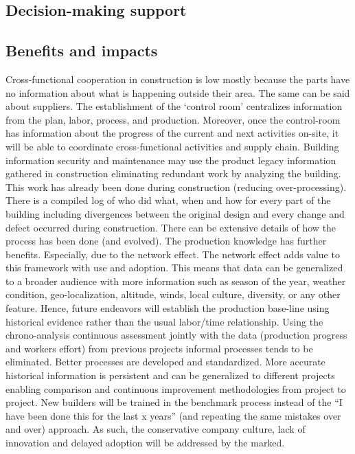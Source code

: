 \documentclass{article}
\begin{document}
\subsection{Decision-making support}
\label{sec:orgb32e0cd}
\subsection{Benefits and impacts}
\label{sec:orga5f2fc6}

Cross-functional cooperation in construction is low mostly because the parts have no information about what is happening outside their area.
The same can be said about suppliers. The establishment of the ‘control room’ centralizes information from the plan, labor, process, and production.
Moreover, once the control-room has information about the progress of the current and next activities on-site, it will be able to coordinate cross-functional activities and supply chain.
Building information security and maintenance may use the product legacy
information gathered in construction eliminating redundant work by analyzing the building.
This work has already been done during construction (reducing over-processing).
There is a compiled log of who did what, when and how for every part of the building including divergences between the original design and every change and defect occurred during construction. There can be extensive details of how the process has been done (and evolved).
The production knowledge has further benefits.
Especially, due to the network effect.
The network effect adds value to this framework with use and adoption.
This means that data can be generalized to a broader audience with more information such as season of the year, weather condition, geo-localization, altitude, winds, local culture, diversity, or any other feature.
Hence, future endeavors will establish the production base-line using historical evidence rather than the usual labor/time relationship.
Using the chrono-analysis continuous assessment jointly with the data (production progress and workers effort) from previous projects informal processes tends to be eliminated.
Better processes are developed and standardized.
More accurate historical information is persistent and can be generalized to different projects enabling comparison and continuous improvement methodologies from project to project.
New builders will be trained in the benchmark process instead of the “I have been done this for the last x years” (and repeating the same mistakes over and over) approach.
As such, the conservative company culture, lack of innovation and delayed adoption will be addressed by the marked.
\end{document}
